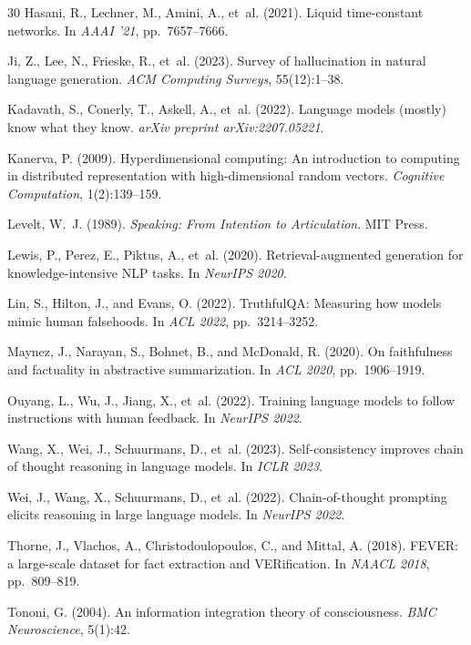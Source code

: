 \documentclass[12pt,a4paper]{article}
\begin{document}
\begin{thebibliography}{30}
Hasani, R., Lechner, M., Amini, A., et~al. (2021).
\newblock Liquid time-constant networks.
\newblock In \emph{AAAI '21}, pp.\ 7657--7666.

Ji, Z., Lee, N., Frieske, R., et~al. (2023).
\newblock Survey of hallucination in natural language generation.
\newblock \emph{ACM Computing Surveys}, 55(12):1--38.

Kadavath, S., Conerly, T., Askell, A., et~al. (2022).
\newblock Language models (mostly) know what they know.
\newblock \emph{arXiv preprint arXiv:2207.05221}.

Kanerva, P. (2009).
\newblock Hyperdimensional computing: An introduction to computing in distributed representation with high-dimensional random vectors.
\newblock \emph{Cognitive Computation}, 1(2):139--159.

Levelt, W.~J. (1989).
\newblock \emph{Speaking: From Intention to Articulation}.
\newblock MIT Press.

Lewis, P., Perez, E., Piktus, A., et~al. (2020).
\newblock Retrieval-augmented generation for knowledge-intensive NLP tasks.
\newblock In \emph{NeurIPS 2020}.

Lin, S., Hilton, J., and Evans, O. (2022).
\newblock TruthfulQA: Measuring how models mimic human falsehoods.
\newblock In \emph{ACL 2022}, pp.\ 3214--3252.

Maynez, J., Narayan, S., Bohnet, B., and McDonald, R. (2020).
\newblock On faithfulness and factuality in abstractive summarization.
\newblock In \emph{ACL 2020}, pp.\ 1906--1919.

Ouyang, L., Wu, J., Jiang, X., et~al. (2022).
\newblock Training language models to follow instructions with human feedback.
\newblock In \emph{NeurIPS 2022}.

Wang, X., Wei, J., Schuurmans, D., et~al. (2023).
\newblock Self-consistency improves chain of thought reasoning in language models.
\newblock In \emph{ICLR 2023}.

Wei, J., Wang, X., Schuurmans, D., et~al. (2022).
\newblock Chain-of-thought prompting elicits reasoning in large language models.
\newblock In \emph{NeurIPS 2022}.

Thorne, J., Vlachos, A., Christodoulopoulos, C., and Mittal, A. (2018).
\newblock FEVER: a large-scale dataset for fact extraction and VERification.
\newblock In \emph{NAACL 2018}, pp.\ 809--819.

Tononi, G. (2004).
\newblock An information integration theory of consciousness.
\newblock \emph{BMC Neuroscience}, 5(1):42.

\end{thebibliography}
\end{document}
